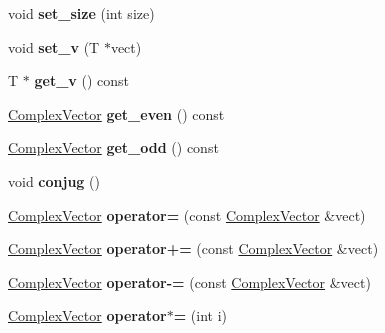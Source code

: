 \begin{DoxyCompactItemize}
void {\bfseries set\+\_\+size} (int size)
\item 
\mbox{\label{class_complex_vector_ac044e82a23439233ccbdaddc6dd67fdd}} 
void {\bfseries set\+\_\+v} (T $\ast$vect)
\item 
\mbox{\label{class_complex_vector_aa54cbb926df97102a10ea28d296c3fe1}} 
T $\ast$ {\bfseries get\+\_\+v} () const
\item 
\mbox{\label{class_complex_vector_ad0a3a67d52cf99cabf6469ae39eef982}} 
\hyperlink{class_complex_vector}{Complex\+Vector} {\bfseries get\+\_\+even} () const
\item 
\mbox{\label{class_complex_vector_a0f462fafc3c6d39a80c055c7d1b3403f}} 
\hyperlink{class_complex_vector}{Complex\+Vector} {\bfseries get\+\_\+odd} () const
\item 
\mbox{\label{class_complex_vector_a64a77715cdf410b73c5dbdd95acb08ed}} 
void {\bfseries conjug} ()
\item 
\mbox{\label{class_complex_vector_aca410c64cab30073a0f9ad9fe4a55167}} 
\hyperlink{class_complex_vector}{Complex\+Vector} {\bfseries operator=} (const \hyperlink{class_complex_vector}{Complex\+Vector} \&vect)
\item 
\mbox{\label{class_complex_vector_a4fb80d348613a67a84db3462a7296e57}} 
\hyperlink{class_complex_vector}{Complex\+Vector} {\bfseries operator+=} (const \hyperlink{class_complex_vector}{Complex\+Vector} \&vect)
\item 
\mbox{\label{class_complex_vector_a49d71df3b80f5946e35613ce7f197c98}} 
\hyperlink{class_complex_vector}{Complex\+Vector} {\bfseries operator-\/=} (const \hyperlink{class_complex_vector}{Complex\+Vector} \&vect)
\item 
\mbox{\label{class_complex_vector_a0bca6924cd154b01199bc2358c5cd8b0}} 
\hyperlink{class_complex_vector}{Complex\+Vector} {\bfseries operator$\ast$=} (int i)
\item 
\mbox{\label{class_complex_vector_a6ace55f968dc34dbda0f61c10be048ad}} 

\end{DoxyCompactItemize}
